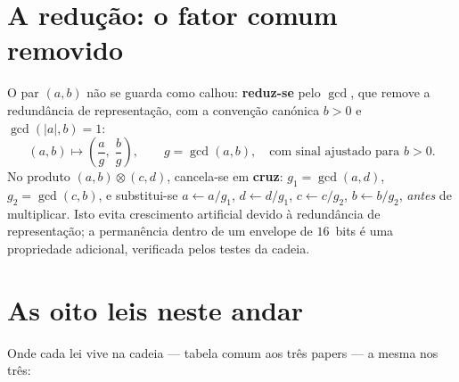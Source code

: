 \documentclass[11pt,a4paper]{article}
\begin{document}
\section{A redução: o fator comum removido}\label{sec:reduz}

O par $(a,b)$ não se guarda como calhou: \textbf{reduz-se} pelo $\gcd$, que
remove a redundância de representação, com a convenção canónica $b>0$ e
$\gcd(\lvert a\rvert,b)=1$:
\[
(a,b)\mapsto\left(\frac{a}{g},\;\frac{b}{g}\right),\qquad g=\gcd(a,b),
\quad\text{com sinal ajustado para }b>0.
\]
No produto $(a,b)\otimes(c,d)$, cancela-se em \textbf{cruz}:
$g_{1}=\gcd(a,d)$, $g_{2}=\gcd(c,b)$, e substitui-se
$a\leftarrow a/g_{1}$, $d\leftarrow d/g_{1}$,
$c\leftarrow c/g_{2}$, $b\leftarrow b/g_{2}$,
\emph{antes} de multiplicar. Isto evita
crescimento artificial devido à redundância de representação; a permanência
dentro de um envelope de $16$~bits é uma propriedade adicional,
verificada pelos testes da cadeia.

\section{As oito leis neste andar}\label{sec:leis}

\noindent Onde cada lei vive na cadeia --- tabela comum aos três papers
--- a mesma nos três:
\end{document}
